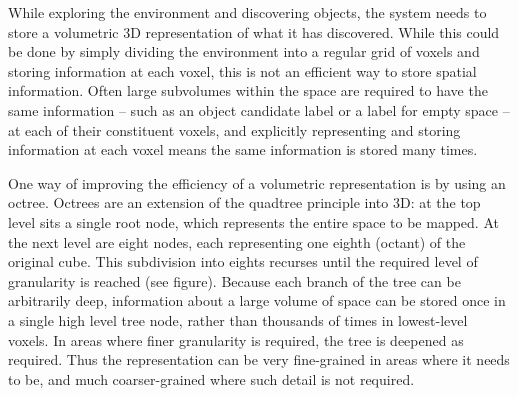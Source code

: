 
While exploring the environment and discovering objects, the system needs to store a volumetric 3D representation of what it has discovered.
While this could be done by simply dividing the environment into a regular grid of voxels and storing information at each voxel, this is not an efficient way to store spatial information.
Often large subvolumes within the space are required to have the same information -- such as an object candidate label or a label for empty space -- at each of their constituent voxels, and explicitly representing and storing information at each voxel means the same information is stored many times.

One way of improving the efficiency of a volumetric representation is by using an octree.
Octrees are an extension of the quadtree principle into 3D: at the top level sits a single root node, which represents the entire space to be mapped.
At the next level are eight nodes, each representing one eighth (octant) of the original cube.
This subdivision into eights recurses until the required level of granularity is reached (see figure).
Because each branch of the tree can be arbitrarily deep, information about a large volume of space can be stored once in a single high level tree node, rather than thousands of times in lowest-level voxels.
In areas where finer granularity is required, the tree is deepened as required.
Thus the representation can be very fine-grained in areas where it needs to be, and much coarser-grained where such detail is not required.
